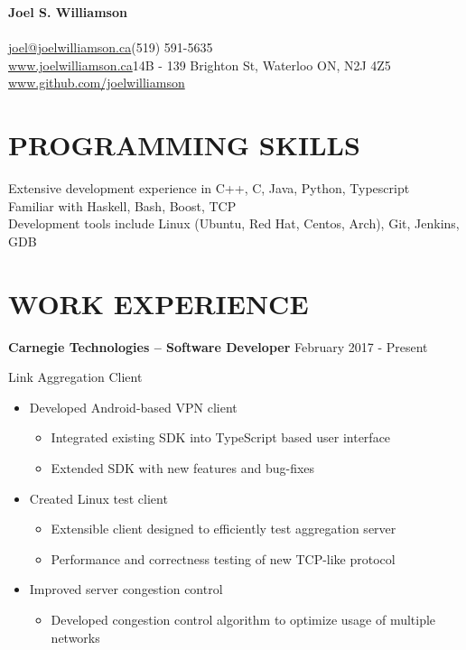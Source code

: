 \documentclass{res}
\begin{document}
 

\begin{center}
{\Large\bf Joel S. Williamson}
\end{center}
\paragraph{}
       \href{mailto:joel@joelwilliamson.ca}{joel@joelwilliamson.ca}\hfill(519) 591-5635\\
       \url{www.joelwilliamson.ca}\hfill14B - 139 Brighton St, Waterloo ON, N2J 4Z5\\
       \url{www.github.com/joelwilliamson}
 
\begin{resume}

  \section{PROGRAMMING SKILLS}
  \vspace{3mm}
  Extensive development experience in C++, C, Java, Python, Typescript\\
  Familiar with Haskell, Bash, Boost, TCP\\
  Development tools include Linux (Ubuntu, Red Hat, Centos, Arch), Git, Jenkins, GDB
  \section{WORK EXPERIENCE}
  \vspace{3mm}
         {\bf Carnegie Technologies -- Software Developer} \hfill February 2017 - Present\vspace{-3mm}

         Link Aggregation Client
         \begin{itemize}
         \item Developed Android-based VPN client
           \begin{itemize}
           \item Integrated existing SDK into TypeScript based user interface
           \item Extended SDK with new features and bug-fixes
           \end{itemize}
         \item Created Linux test client
           \begin{itemize}
           \item Extensible client designed to efficiently test aggregation server
           \item Performance and correctness testing of new TCP-like protocol
           \end{itemize}
         \item Improved server congestion control
           \begin{itemize}
           \item Developed congestion control algorithm to optimize usage of multiple networks
           \end{itemize}
         \end{itemize}


\end{resume}
\end{document}
